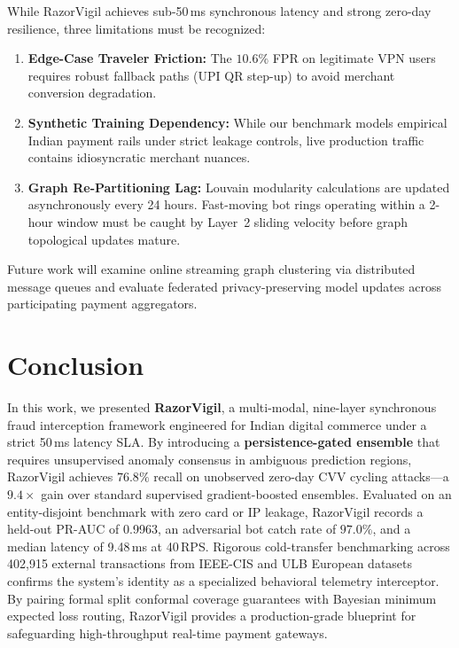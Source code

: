 \documentclass[conference]{IEEEtran}
\begin{document}
While RazorVigil achieves sub-50\,ms synchronous latency and strong zero-day resilience, three limitations must be recognized:
\begin{enumerate}
    \item \textbf{Edge-Case Traveler Friction:} The $10.6\%$ FPR on legitimate VPN users requires robust fallback paths (UPI QR step-up) to avoid merchant conversion degradation.
    \item \textbf{Synthetic Training Dependency:} While our benchmark models empirical Indian payment rails under strict leakage controls, live production traffic contains idiosyncratic merchant nuances.
    \item \textbf{Graph Re-Partitioning Lag:} Louvain modularity calculations are updated asynchronously every 24 hours. Fast-moving bot rings operating within a 2-hour window must be caught by Layer~2 sliding velocity before graph topological updates mature.
\end{enumerate}
Future work will examine online streaming graph clustering via distributed message queues and evaluate federated privacy-preserving model updates across participating payment aggregators.

\section{Conclusion}
\label{sec:conclusion}

In this work, we presented \textbf{RazorVigil}, a multi-modal, nine-layer synchronous fraud interception framework engineered for Indian digital commerce under a strict 50\,ms latency SLA. By introducing a \textbf{persistence-gated ensemble} that requires unsupervised anomaly consensus in ambiguous prediction regions, RazorVigil achieves $76.8\%$ recall on unobserved zero-day CVV cycling attacks---a $9.4\times$ gain over standard supervised gradient-boosted ensembles. Evaluated on an entity-disjoint benchmark with zero card or IP leakage, RazorVigil records a held-out PR-AUC of 0.9963, an adversarial bot catch rate of $97.0\%$, and a median latency of 9.48\,ms at 40\,RPS. Rigorous cold-transfer benchmarking across 402,915 external transactions from IEEE-CIS and ULB European datasets confirms the system's identity as a specialized behavioral telemetry interceptor. By pairing formal split conformal coverage guarantees with Bayesian minimum expected loss routing, RazorVigil provides a production-grade blueprint for safeguarding high-throughput real-time payment gateways.



\end{document}
